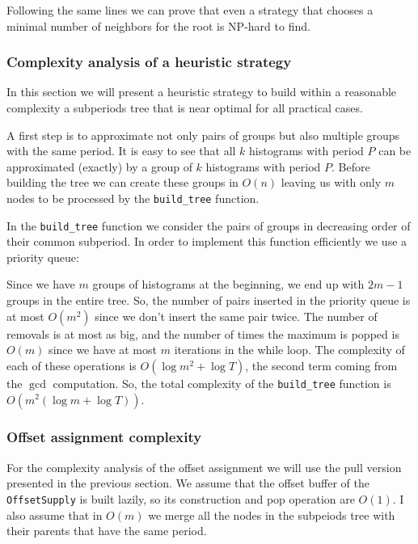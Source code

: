 Following the same lines we can prove that even a strategy that chooses a minimal number of neighbors for the root is NP-hard to find.

\subsubsection*{Complexity analysis of a heuristic strategy}

In this section we will present a heuristic strategy to build within a reasonable complexity a subperiods tree that is near optimal for all practical cases. 

A first step is to approximate not only pairs of groups but also multiple groups with the same period. It is easy to see that all $k$ histograms with period $P$ can be approximated (exactly) by a group of $k$ histograms with period $P$. Before building the tree we can create these groups in $O(n)$ leaving us with only $m$ nodes to be processed by the \verb+build_tree+ function. 

In the \verb+build_tree+ function we consider the pairs of groups in decreasing order of their common subperiod. In order to implement this function efficiently we use a priority queue:



Since we have $m$ groups of histograms at the beginning, we end up with $2m-1$ groups in the entire tree. So, the number of pairs inserted in the priority queue is at most $O(m^2)$ since we don't insert the same pair twice. The number of removals is at most as big, and the number of times the maximum is popped is $O(m)$ since we have at most $m$ iterations in the while loop. The complexity of each of these operations is $O(\log m^2+\log T)$, the second term coming from the $\gcd$ computation. So, the total complexity of the \verb+build_tree+ function is $O(m^2(\log m + \log T))$. 

\subsubsection*{Offset assignment complexity}

For the complexity analysis of the offset assignment we will use the pull version presented in the previous section. We assume that the offset buffer of the \verb+OffsetSupply+ is built lazily, so its construction and pop operation are $O(1)$. I also assume that in $O(m)$ we merge all the nodes in the subpeiods tree with their parents that have the same period.

